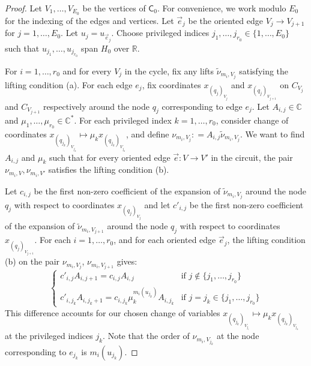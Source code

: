 \documentclass{article}
\newcommand{\tropC}{\mathsf{C}}
\begin{document}
\begin{proof}
    Let $V_1, \ldots, V_{E_0}$ be the vertices of $\tropC_0$. For convenience, we work modulo $E_0$ for the indexing of the edges and vertices. Let $\vec{e}_j$ be the oriented edge $V_j \rightarrow V_{j+1}$ for $j = 1, \ldots, E_0$. Let $u_j = u_{\vec{e}_j}$. Choose privileged indices $j_1, \ldots, j_{r_0} \in \{1, \ldots, E_0\}$  such that $u_{j_1}, \ldots, u_{j_{r_0}}$ span $H_0$ over $\mathbb{R}$. 

    For $i = 1, \ldots, r_0$ and for every $V_j$ in the cycle, fix any lifts $\tilde{\nu}_{m_i, V_j}$ satisfying the lifting condition (a). For each edge $e_j$, fix coordinates $x_{(q_j)_{V_j}}$ and $x_{(q_j)_{V_{j+1}}}$ on $C_{V_j}$ and $C_{V_{j+1}}$ respectively around the node $q_j$ corresponding to edge $e_j$. Let $A_{i,j} \in \mathbb{C}$ and $\mu_{1}, \ldots, \mu_{r_0} \in \mathbb{C}^*$. For each privileged index $k=1,\ldots, r_0$, consider change of coordinates $x_{(q_{j_k})_{V_{j_k}}}\mapsto \mu_{k} x_{(q_{j_k})_{V_{j_k}}}$, and define $\nu_{m_i, V_j} \colon = A_{i,j}\tilde{\nu}_{m_i, V_j}$. 
    We want to find $A_{i,j}$ and $ \mu_k$ such that for every oriented edge $\vec{e} \colon V \rightarrow V'$ in the circuit, the pair $\nu_{m_i, V}, \nu_{m_i, V'}$ satisfies the lifting condition (b). 
 
    Let $c_{i,j}$ be the first non-zero coefficient of the expansion of $\tilde{\nu}_{m_i, V_j}$ around the node $q_j$ with respect to coordinates $x_{(q_j)_{V_j}}$ and let $c'_{i,j}$ be the first non-zero coefficient of the expansion of $\tilde{\nu}_{m_i, V_{j+1}}$ around the node $q_j$ with respect to coordinates $x_{(q_j)_{V_{j+1}}}$. 
    For each $i = 1, \ldots, r_0$, and for each oriented edge $\vec{e}_j$, the lifting condition (b) on the pair $\nu_{m_i, V_j}$, $\nu_{m_i, V_{j+1}}$ gives:
    $$ \begin{cases} 
        c'_{i,j} A_{i,j+1} = c_{i,j} A_{i,j} & \text{if } j \notin \{j_1,\ldots, j_{r_0} \} \\ 
        c'_{i,j_k} A_{i,j_k+1} = c_{i,j_k} \mu_k^{m_i(u_{j_k})} A_{i,j_k} & \text{if } j=j_k \in \{j_1,\ldots, j_{r_0} \} 
    \end{cases}$$
     This difference accounts for our chosen change of variables $x_{(q_{j_k})_{V_{j_i}}} \mapsto \mu_{k} x_{(q_{j_k})_{V_{j_k}}}$ at the privileged indices $j_k$. Note that the order of $\nu_{m_i,V_{j_k}}$ at the node corresponding to $e_{j_k}$ is $m_i(u_{j_k})$. 


\end{proof}
\end{document}

